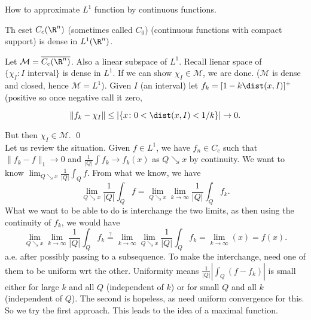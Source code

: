 How to approximate $L^1$ function by continuous functions.


\begin{thm}
Th eset $C_c(\R^n)$ (sometimes called $C_0$) (continuous functions with compact support) is dense in $L^1(\R^n)$. 
\end{thm}

\pf Let $\mathcal{M}= \overline{C_c(\R^n)}$. Also a linear subspace of $L^1$. Recall lienar space of $\{ \chi_I \colon I \text{ interval} \}$ is dense in $L^1$. If we can show $\chi_I \in \mathcal{M}$, we are done. ($\mathcal{M}$ is dense and closed, hence $\mathcal{M}= L^1$). Given $I$ (an interval) let $f_k = [1- k \dist(x,I)]^+$ (positive so once negative call it zero,



	\[
	\| f_k - \chi_I \| \leq |\{ x \colon 0<\dist(x,I)<1/k \}| \to 0.
	\]


But then $\chi_I \in \mathcal{M}$. \qed \\


Let us review the situation. Given $f \in L^1$, we have $f_n \in C_c$ such that $\| f_k - f \|_1 \to 0$ and $\frac{1}{|Q|} \int f_k \to f_k(x)$ as $Q \searrow x$ by continuity. We want to know $\lim_{Q \searrow x} \frac{1}{|Q|} \int_Q f$. From what we know, we have
	\[
	\lim_{Q \searrow x} \dfrac{1}{|Q|} \int_Q f= \lim_{Q \searrow x} \lim_{k \to \infty} \dfrac{1}{|Q|} \int_Q f_k. 
	\]
What we want to be able to do is interchange the two limits, as then using the continuity of $f_k$, we would have 
	\[
	\lim_{Q \searrow x} \lim_{k \to \infty} \dfrac{1}{|Q|} \int_Q f_k\stackrel{?}{=} \lim_{k \to \infty} \lim_{Q \searrow x} \dfrac{1}{|Q|} \int_Q f_k= \lim_{k \to \infty}(x)= f(x).
	\]
a.e. after possibly passing to a subsequence. To make the interchange, need one of them to be uniform wrt the other. Uniformity means $\frac{1}{|Q|} | \int_Q (f-f_k)|$ is small either for large $k$ and all $Q$ (independent of $k$) or for small $Q$ and all $k$ (independent of $Q$). The second is hopeless, as need uniform convergence for this. So we try the first approach. This leads to the idea of a maximal function. 


